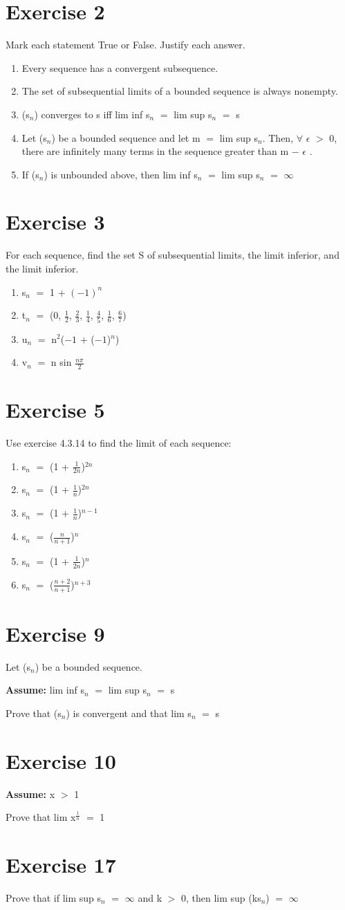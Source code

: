 \documentclass{article}
\newcommand{\mt}[1]{\ensuremath{#1}}
\newcommand\bsc[2][\DefaultOpt]{%
  \def\DefaultOpt{#2}%
  \section[#1]{#2}%
}
\newcommand{\balist}{\begin{enumerate}[label=\alph*.]}
\newcommand{\elist}{\end{enumerate}}
\newcommand{\as}[1]{\textbf{Assume: } #1}
\newcommand{\ep}{\mt{\epsilon} }         %
\newcommand{\fa}{\mt{\forall} }          %
\newcommand{\prn}[1]{(#1)}
\newcommand{\ps}{\mt{+} }
\newcommand{\ms}{\mt{-} }
\newcommand{\gr}{\mt{>} }
\newcommand{\eql}{\mt{=} }
\newcommand{\uw}[2]{#1\mt{_{#2}}}
\newcommand{\uf}[2]{#1\mt{^{#2}}}
\newcommand{\frc}[2]{\mt{\frac{#1}{#2}}}
\newcommand{\infy}{\mt{\infty} }
\begin{document}
\bsc{Exercise 2}{

Mark each statement True or False. Justify each answer.

\balist
\item Every sequence has a convergent subsequence.
\item The set of subsequential limits of a bounded sequence is always nonempty.
\item \prn{\uw{s}{n}} converges to s iff lim inf \uw{s}{n} \eql lim sup \uw{s}{n} \eql s
\item Let (\uw{s}{n}) be a bounded sequence and let m \eql lim sup \uw{s}{n}. Then, \fa \ep \gr 0, there are infinitely many terms in the sequence greater than m \ms \ep.
\item If \prn{\uw{s}{n}} is unbounded above, then lim inf \uw{s}{n} \eql lim sup \uw{s}{n} \eql \infy 
\elist 

}

\bsc{Exercise 3}{

For each sequence, find the set S of subsequential limits, the limit inferior, and the limit inferior.

\balist
\item \uw{s}{n} \eql 1 + $(-1)^n$
\item \uw{t}{n} \eql (0, \frc{1}{2}, \frc{2}{3}, \frc{1}{4}, \frc{4}{5}, \frc{1}{6}, \frc{6}{7})
\item \uw{u}{n} \eql \uf{n}{2}($-1$ \ps ($-1$)$^n$)
\item \uw{v}{n} \eql n sin \frc{n\pi}{2}
\elist

}

\bsc{Exercise 5}{

Use exercise 4.3.14 to find the limit of each sequence:

\balist
\item \uw{s}{n} \eql (1 + \frc{1}{2n})$^{2n}$
\item \uw{s}{n} \eql (1 + \frc{1}{n})$^{2n}$
\item \uw{s}{n} \eql (1 + \frc{1}{n})$^{n - 1}$
\item \uw{s}{n} \eql (\frc{n	}{n + 1})$^{n}$
\item \uw{s}{n} \eql (1 + \frc{1	}{2n})$^{n}$
\item \uw{s}{n} \eql (\frc{n + 2	}{n + 1})$^{n + 3}$
\elist

}

\bsc{Exercise 9}{

Let \prn{\uw{s}{n}} be a bounded sequence.

\as{lim inf \uw{s}{n} \eql lim sup \uw{s}{n} \eql s}

Prove that \prn{\uw{s}{n}} is convergent and that lim \uw{s}{n} \eql s

}

\bsc{Exercise 10}{

\as{x \gr 1}

Prove that lim \uf{x}{\frc{1}{n}} \eql 1

}

\bsc{Exercise 17}{

Prove that if lim sup \uw{s}{n} \eql \infy and k \gr 0, then lim sup (k\uw{s}{n}) \eql \infy 

}
\end{document}
